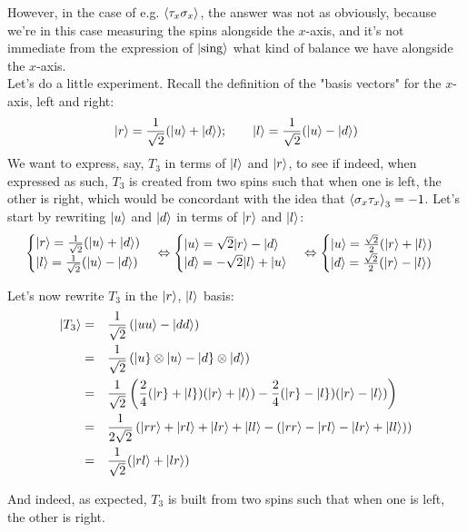 \documentclass[solutions.tex]{subfiles}
\begin{document}
However, in the case of e.g. $\left\langle \tau_x\sigma_x \right\rangle$, the answer was
not as obviously, because we're in this case measuring the spins alongside
the $x$-axis, and it's not immediate from the expression of
$|\text{sing}\rangle$ what kind of balance we have alongside the $x$-axis. \\

Let's do a little experiment. Recall the definition of the "basis
vectors" for the $x$-axis, left and right:
\[
	|r\rangle = \frac1{\sqrt2}(|u\rangle+|d\rangle);\qquad
	|l\rangle = \frac1{\sqrt2}(|u\rangle-|d\rangle)
\]
We want to express, say, $T_3$ in terms of $|l\rangle$ and $|r\rangle$,
to see if indeed, when expressed as such, $T_3$ is created from
two spins such that when one is left, the other is right, which
would be concordant with the idea that $\left\langle \sigma_x\tau_x \right\rangle_3 = -1$.
Let's start by rewriting $|u\rangle$ and $|d\rangle$ in terms of $|r\rangle$
and $|l\rangle$:
\[
	\begin{cases}
		|r\rangle = \frac1{\sqrt2}(|u\rangle+|d\rangle) \\
		|l\rangle = \frac1{\sqrt2}(|u\rangle-|d\rangle)
	\end{cases}\Leftrightarrow\begin{cases}
		|u\rangle = \sqrt2|r\rangle-|d\rangle \\
		|d\rangle = -\sqrt2|l\rangle+|u\rangle \\
	\end{cases}\Leftrightarrow\begin{cases}
		|u\rangle = \frac{\sqrt2}2(|r\rangle+|l\rangle) \\
		|d\rangle = \frac{\sqrt2}2(|r\rangle-|l\rangle) \\
	\end{cases}
\]

Let's now rewrite $T_3$ in the $|r\rangle$, $|l\rangle$ basis:
\begin{equation*}\begin{aligned}
	|T_3\rangle &=&& \frac1{\sqrt2}\left(|uu\rangle-|dd\rangle\right) \\
	~ &=&& \frac1{\sqrt2}\left( |u\}\otimes|u\rangle-|d\}\otimes|d\rangle\right) \\
	~ &=&& \frac1{\sqrt2}\left(
		\frac24(|r\}+|l\})(|r\rangle+|l\rangle)
		-\frac24(|r\}-|l\})(|r\rangle-|l\rangle)
	\right) \\
	~ &=&& \frac1{2\sqrt2}\left(
		|rr\rangle+|rl\rangle+|lr\rangle+|ll\rangle
		-(|rr\rangle-|rl\rangle-|lr\rangle+|ll\rangle)
	\right) \\
	~ &=&&\frac1{\sqrt2}(|rl\rangle+|lr\rangle)
\end{aligned}\end{equation*}

And indeed, as expected, $T_3$ is built from two spins such that when
one is left, the other is right.
\end{document}
